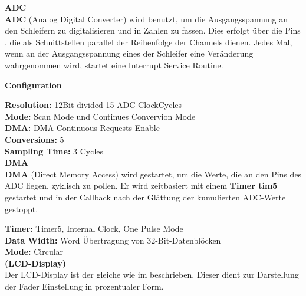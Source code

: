 \textbf{\hypertarget{ADC}{ADC}} \\

\textbf{ADC}\cite{adc} (Analog Digital Converter) wird benutzt, um die Ausgangsspannung an den Schleifern zu digitalisieren und in Zahlen zu fassen. Dies erfolgt über die Pins , die als Schnittstellen parallel der Reihenfolge der Channels  dienen. Jedes Mal, wenn an der Ausgangsspannung eines der Schleifer eine Veränderung wahrgenommen wird, startet eine Interrupt Service Routine.

\textbf{Configuration}

\textbf{Resolution:} 12Bit divided 15 ADC ClockCycles \\
\textbf{Mode:} Scan Mode und Continues Convervion Mode \\
\textbf{DMA:} DMA Continuous Requests Enable \\
\textbf{Conversions:} 5 \\
\textbf{Sampling Time:} 3 Cycles  
\\

\textbf{\hypertarget{DMA}{DMA}} \\

\textbf{DMA} (Direct Memory Access) wird gestartet, um die Werte, die an den Pins des ADC liegen, zyklisch zu pollen. Er wird zeitbasiert mit einem \textbf{Timer tim5} gestartet und in der Callback nach der Glättung der kumulierten ADC-Werte gestoppt.

\textbf{Timer:} Timer5, Internal Clock, One Pulse Mode \\
\textbf{Data Width:} Word Übertragung von 32-Bit-Datenblöcken \\
\textbf{Mode:} Circular \\

\textbf{(LCD-Display)}\\

Der LCD-Display ist der gleiche wie im  beschrieben. Dieser dient zur Darstellung der Fader Einstellung in prozentualer Form.

\newpage

